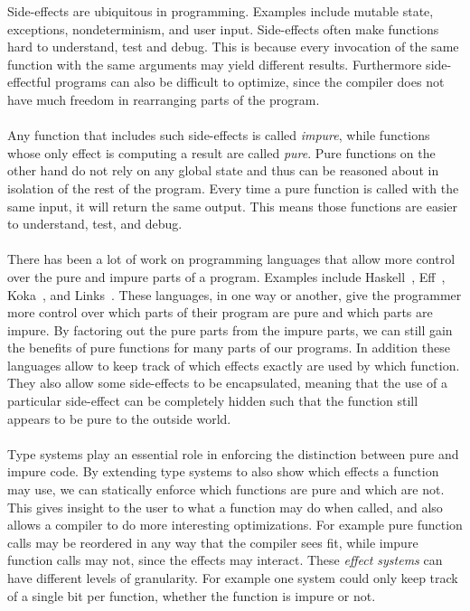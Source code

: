 Side-effects are ubiquitous in programming.
Examples include mutable state, exceptions, nondeterminism, and user input.
Side-effects often make functions hard to understand, test and debug.
This is because every invocation of the same function with the same arguments may yield different results.
Furthermore side-effectful programs can also be difficult to optimize, since the compiler does not have much freedom in rearranging parts of the program.
\\\\
Any function that includes such side-effects is called \emph{impure}, while functions whose only effect is computing a result are called \emph{pure}.
Pure functions on the other hand do not rely on any global state and thus can be reasoned about in isolation of the rest of the program.
Every time a pure function is called with the same input, it will return the same output.
This means those functions are easier to understand, test, and debug.
\\\\
There has been a lot of work on programming languages that allow more control over the pure and impure parts of a program.
Examples include Haskell~\cite{haskell}, Eff~\cite{eff1}, Koka~\cite{koka2}, and Links~\cite{links}.
These languages, in one way or another, give the programmer more control over which parts of their program are pure and which parts are impure.
By factoring out the pure parts from the impure parts, we can still gain the benefits of pure functions for many parts of our programs.
In addition these languages allow to keep track of which effects exactly are used by which function.
They also allow some side-effects to be encapsulated, meaning that the use of a particular side-effect can be completely hidden such that the function still appears to be pure to the outside world.
\\\\
Type systems play an essential role in enforcing the distinction between pure and impure code.
By extending type systems to also show which effects a function may use, we can statically enforce which functions are pure and which are not.
This gives insight to the user to what a function may do when called, and also allows a compiler to do more interesting optimizations.
For example pure function calls may be reordered in any way that the compiler sees fit, while impure function calls may not, since the effects may interact.
These \emph{effect systems} can have different levels of granularity.
For example one system could only keep track of a single bit per function, whether the function is impure or not.

